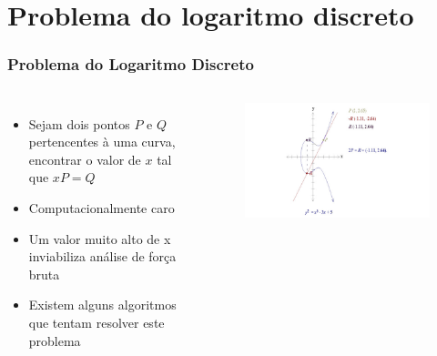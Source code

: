 \documentclass{beamer}
\begin{document}
\section{Problema do logaritmo discreto}
\begin{frame}
\frametitle{Problema do Logaritmo Discreto}
  \begin{columns}[c]
      \begin{itemize}
        \item Sejam dois pontos $P$ e $Q$ pertencentes à uma curva, encontrar o valor de $x$ tal que $xP = Q$
        \item Computacionalmente caro
        \item Um valor muito alto de x inviabiliza análise de força bruta
        \item Existem alguns algoritmos que tentam resolver este problema
      \end{itemize}

      \begin{figure}
        \includegraphics[scale=0.3]{multiplicacao_ponto}
      \end{figure}
  \end{columns}
\end{frame}
\end{document}

